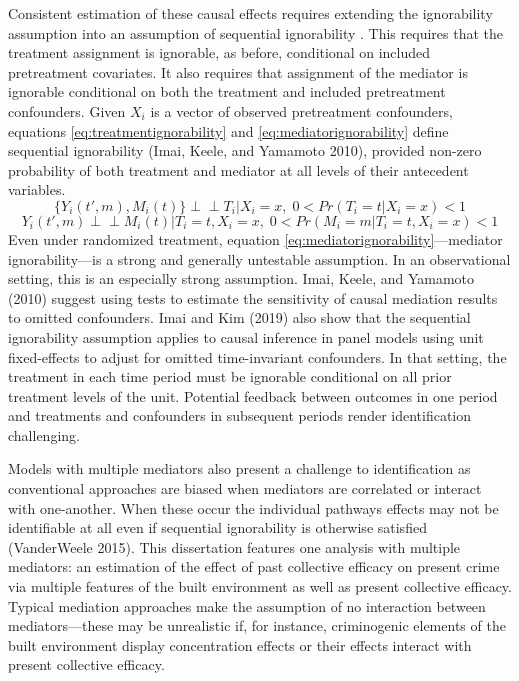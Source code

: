 \documentclass [11pt, proquest] {uwthesis}[2015/03/03]
\begin{document}
Consistent estimation of these causal effects requires extending the ignorability assumption into an assumption of sequential ignorability . This requires that the treatment assignment is ignorable, as before, conditional on included pretreatment covariates. It also requires that assignment of the mediator is ignorable conditional on both the treatment and included pretreatment confounders. Given \(X_i\) is a vector of observed pretreatment confounders, equations \eqref{eq:treatmentignorability} and \eqref{eq:mediatorignorability} define sequential ignorability (Imai, Keele, and Yamamoto 2010), provided non-zero probability of both treatment and mediator at all levels of their antecedent variables.
\begin{equation}
\{ Y_i(t',m), M_i(t) \} \perp\!\!\!\perp T_i | X_i = x,\; 0 < Pr(T_i = t | X_i = x) < 1
\label{eq:treatmentignorability}
\end{equation}
\begin{equation}
Y_i(t',m) \perp\!\!\!\perp M_i(t) | T_i = t, X_i = x,\; 0 < Pr(M_i = m | T_i = t, X_i = x) < 1
\label{eq:mediatorignorability}
\end{equation}
Even under randomized treatment, equation \eqref{eq:mediatorignorability}---mediator ignorability---is a strong and generally untestable assumption. In an observational setting, this is an especially strong assumption. Imai, Keele, and Yamamoto (2010) suggest using tests to estimate the sensitivity of causal mediation results to omitted confounders. Imai and Kim (2019) also show that the sequential ignorability assumption applies to causal inference in panel models using unit fixed-effects to adjust for omitted time-invariant confounders. In that setting, the treatment in each time period must be ignorable conditional on all prior treatment levels of the unit. Potential feedback between outcomes in one period and treatments and confounders in subsequent periods render identification challenging.

Models with multiple mediators also present a challenge to identification as conventional approaches are biased when mediators are correlated or interact with one-another. When these occur the individual pathways effects may not be identifiable at all even if sequential ignorability is otherwise satisfied (VanderWeele 2015). This dissertation features one analysis with multiple mediators: an estimation of the effect of past collective efficacy on present crime via multiple features of the built environment as well as present collective efficacy. Typical mediation approaches make the assumption of no interaction between mediators---these may be unrealistic if, for instance, criminogenic elements of the built environment display concentration effects or their effects interact with present collective efficacy.
\end{document}

